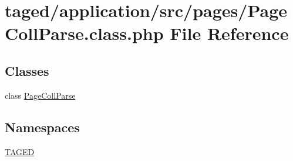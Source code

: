 \hypertarget{_page_coll_parse_8class_8php}{}\section{taged/application/src/pages/\+Page\+Coll\+Parse.class.\+php File Reference}
\label{_page_coll_parse_8class_8php}
\subsection*{Classes}
\begin{DoxyCompactItemize}
\item 
class \hyperlink{class_page_coll_parse}{Page\+Coll\+Parse}
\end{DoxyCompactItemize}
\subsection*{Namespaces}
\begin{DoxyCompactItemize}
\item 
 \hyperlink{namespace_t_a_g_e_d}{T\+A\+G\+ED}
\end{DoxyCompactItemize}

